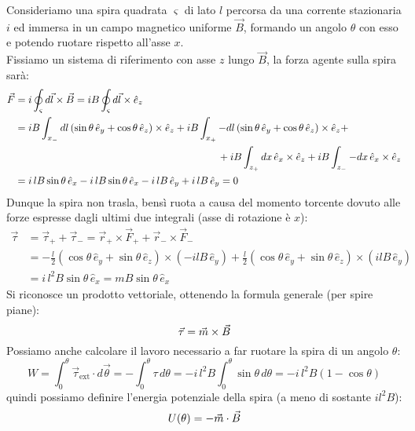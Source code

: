 Consideriamo una spira quadrata $ \varsigma $ di lato $ l $ percorsa da una corrente stazionaria $ i $ ed immersa in un campo magnetico uniforme $ \vec{B} $, formando un angolo $ \theta $ con esso e potendo ruotare rispetto all'asse $ x $. \\ 
%
Fissiamo un sistema di riferimento con asse $ z $ lungo $ \vec{B} $, la forza agente sulla spira sarà:
\begin{equation}
	\begin{split}
		\vec{F} &= i \oint_{\varsigma} d\vec{l}\times\vec{B} = i B \oint_{\varsigma} d\vec{l}\times\hat{e}_z \\ 
			&= iB\int_{x_-} dl \left(\sin\theta\,\hat{e}_y + \cos\theta\,\hat{e}_z\right) \times \hat{e}_z + iB\int_{x_+} -dl \left(\sin\theta\,\hat{e}_y + \cos\theta\,\hat{e}_z\right) \times \hat{e}_z + \\ 
			& \qquad\qquad\qquad\qquad\qquad\qquad\qquad\qquad\qquad\qquad + iB\int_{z_+} dx \, \hat{e}_x \times \hat{e}_z + iB\int_{z_-} -dx \,\hat{e}_x \times \hat{e}_z \\ 
			&= i\,lB\sin\theta\,\hat{e}_x - i\,lB\sin\theta\,\hat{e}_x - i\,lB\,\hat{e}_y + i\,lB\,\hat{e}_y = 0
	\end{split}
	\label{eq:}
\end{equation}
Dunque la spira non trasla, bensì ruota a causa del momento torcente dovuto alle forze espresse dagli ultimi due integrali (asse di rotazione è $ x $):
\begin{equation}
	\begin{split}
		\vec{\tau} &= \vec{\tau}_+ + \vec{\tau}_- = \vec{r}_+ \times \vec{F}_+ + \vec{r}_- \times \vec{F}_- \\ 
			   &= -\frac{l}{2} \left(\cos\theta\,\hat{e}_y + \sin\theta\,\hat{e}_z\right) \times \left(-ilB\,\hat{e}_y\right) + \frac{l}{2} \left(\cos\theta\,\hat{e}_y + \sin\theta\,\hat{e}_z\right) \times \left(ilB\,\hat{e}_y\right) \\ 
			   &= i \, l^2 B \sin\theta \,\hat{e}_x = m B \sin\theta\,\hat{e}_x
	\end{split}
	\label{eq:calc-mom-sp}
\end{equation}
Si riconosce un prodotto vettoriale, ottenendo la formula generale (per spire piane):
\begin{equation}
	\vec{\tau} = \vec{m}\times\vec{B}
	\label{eq:mom-sp}
\end{equation}
Possiamo anche calcolare il lavoro necessario a far ruotare la spira di un angolo $ \theta $:
\begin{equation}
	W = \int_0^{\theta} \vec{\tau}_{\text{ext}} \cdot d\vec{\theta} = - \int_0^{\theta} \tau \, d\theta = - i \, l^2 B \int_0^{\theta} \sin\theta \,d\theta = - i \, l^2 B \left(1 - \cos\theta\right)
	\label{eq:}
\end{equation}
quindi possiamo definire l'energia potenziale della spira (a meno di sostante $ il^2 B $):
\begin{equation}
	U(\theta) = -\vec{m}\cdot\vec{B}
	\label{eq:pot-sp}
\end{equation}

